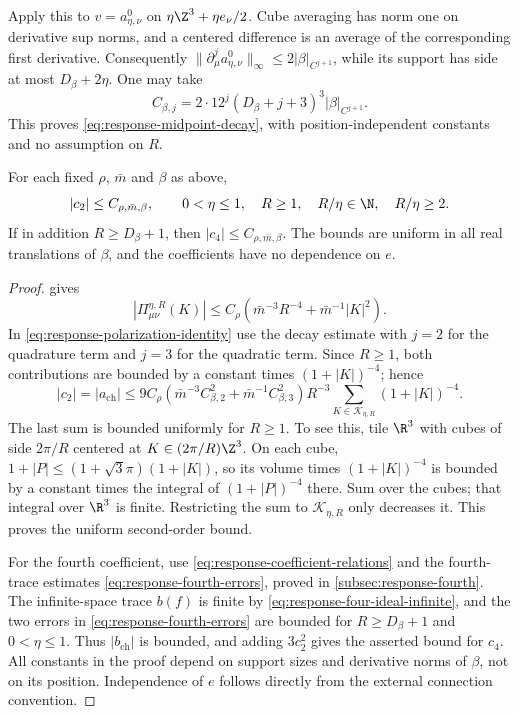 \documentclass[11pt,letterpaper,reqno]{amsart}
\begin{document}
Apply this to $v=a_{\eta,\nu}^0$ on
$\eta\Z^3+\eta e_\nu/2$. Cube averaging has norm one on
derivative sup norms, and a centered difference is an average
of the corresponding first derivative. Consequently
$\|\partial_\mu^ja_{\eta,\nu}^0\|_\infty
\le2|\beta|_{C^{j+1}}$, while its support has side at most
$D_\beta+2\eta$. One may take
\[
 C_{\beta,j}=2\cdot12^j(D_\beta+j+3)^3|\beta|_{C^{j+1}}.
\]
This proves \eqref{eq:response-midpoint-decay}, with position-independent
constants and no assumption on $R$.

\begin{proposition}\label{prop:response-uniform-coefficients}
For each fixed $\rho$, $\bar m$ and $\beta$ as above,
\[
 |c_2|\le C_{\rho,\bar m,\beta},
              \qquad 0<\eta\le1,\quad R\ge1,\quad
                         R/\eta\in\N,\quad R/\eta\ge2.
\]
If in addition $R\ge D_\beta+1$, then
$|c_4|\le C_{\rho,\bar m,\beta}$.
The bounds are uniform in all real translations of $\beta$,
and the coefficients have no dependence on $e$.
\end{proposition}

\begin{proof}
 gives
\[
 |\Pi^{\eta,R}_{\mu\nu}(K)|
   \le C_\rho(\bar m^{-3}R^{-4}+\bar m^{-1}|K|^2).
\]
In \eqref{eq:response-polarization-identity} use the decay
estimate with $j=2$ for the quadrature term and $j=3$ for
the quadratic term. Since $R\ge1$, both contributions are
bounded by a constant times $(1+|K|)^{-4}$; hence
\[
 |c_2|=|a_{\mathrm{ch}}|
 \le9C_\rho
       (\bar m^{-3}C_{\beta,2}^2+\bar m^{-1}C_{\beta,3}^2)
       R^{-3}\sum_{K\in\mathcal K_{\eta,R}}(1+|K|)^{-4}.
\]
The last sum is bounded uniformly for $R\ge1$. To see this,
tile $\R^3$ with cubes of side $2\pi/R$ centered at
$K\in(2\pi/R)\Z^3$. On each cube,
$1+|P|\le(1+\sqrt3\pi)(1+|K|)$, so its volume times
$(1+|K|)^{-4}$ is bounded by a constant times the integral
of $(1+|P|)^{-4}$ there. Sum over the cubes; that integral
over $\R^3$ is finite. Restricting the sum to
$\mathcal K_{\eta,R}$ only decreases it. This proves the
uniform second-order bound.

For the fourth coefficient, use
\eqref{eq:response-coefficient-relations} and
the fourth-trace estimates \eqref{eq:response-fourth-errors}, proved in \cref{subsec:response-fourth}. The infinite-space
trace $b(f)$ is finite by \eqref{eq:response-four-ideal-infinite},
and the two errors in \eqref{eq:response-fourth-errors} are
bounded for $R\ge D_\beta+1$ and $0<\eta\le1$.
Thus $|b_{\mathrm{ch}}|$ is bounded, and adding $3c_2^2$
gives the asserted bound for $c_4$. All constants in the
proof depend on support sizes and derivative norms of $\beta$,
not on its position. Independence of $e$ follows directly
from the external connection convention.
\end{proof}
\end{document}
